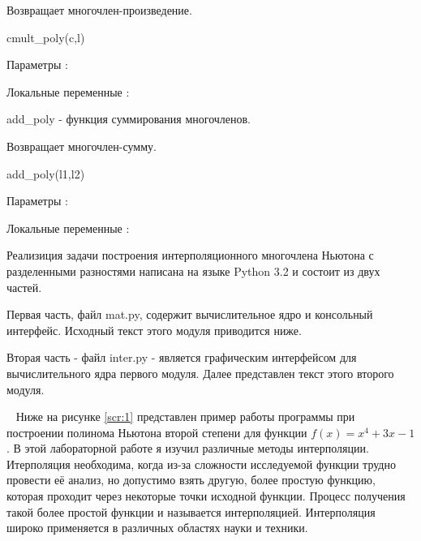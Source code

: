 {Возвращает многочлен-произведение.
    
cmult\_poly(c,l)

Параметры :
    
Локальные переменные :
\item add\_poly - функция суммирования многочленов.
      
Возвращает многочлен-сумму.
    
add\_poly(l1,l2)

Параметры :
   
Локальные переменные  :
}
\clearpage
{}
Реализиция задачи построения  интерполяционного многочлена Ньютона с разделенными разностями написана на языке Python 3.2 и состоит из двух частей.

Первая часть, файл mat.py, содержит вычислительное ядро и консольный интерфейс. Исходный текст этого модуля приводится ниже.


Вторая часть - файл inter.py - является графическим интерфейсом для вычислительного ядра первого модуля. Далее представлен текст этого второго модуля.


\clearpage

\ 
Ниже на рисунке \ref{scr:1} представлен пример работы программы при построении полинома Ньютона второй степени для функции $f(x)=x^4+3x-1$.
\pic{SCR1.png}{Пример работы программы}{scr:1}{H}
\clearpage
{}
В этой лабораторной работе я изучил различные методы интерполяции. Итерполяция необходима, когда из-за сложности исследуемой функции трудно провести её анализ, но допустимо взять другую, более простую функцию, которая проходит через некоторые точки исходной функции. Процесс получения такой более простой функции и называется интерполяцией. Интерполяция широко применяется в различных областях науки и техники.

